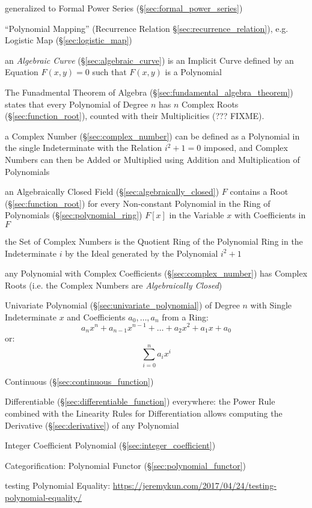 \fist generalized to Formal Power Series (\S\ref{sec:formal_power_series})

\fist ``Polynomial Mapping'' (Recurrence Relation
\S\ref{sec:recurrence_relation}), e.g. Logistic Map (\S\ref{sec:logistic_map})

\fist an \emph{Algebraic Curve} (\S\ref{sec:algebraic_curve}) is an Implicit
Curve defined by an Equation $F(x,y) = 0$ such that $F(x,y)$ is a Polynomial

The Funadmental Theorem of Algebra (\S\ref{sec:fundamental_algebra_theorem})
states that every Polynomial of Degree $n$ has $n$ Complex Roots
(\S\ref{sec:function_root}), counted with their Multiplicities (??? FIXME).

a Complex Number (\S\ref{sec:complex_number}) can be defined as a Polynomial in
the single Indeterminate with the Relation $i^2 + 1 = 0$ imposed, and Complex
Numbers can then be Added or Multiplied using Addition and Multiplication of
Polynomials

an Algebraically Closed Field (\S\ref{sec:algebraically_closed}) $F$ contains a
Root (\S\ref{sec:function_root}) for every Non-constant Polynomial in the Ring
of Polynomials (\S\ref{sec:polynomial_ring}) $F[x]$ in the Variable $x$ with
Coefficients in $F$

the Set of Complex Numbers is the Quotient Ring of the Polynomial Ring in the
Indeterminate $i$ by the Ideal generated by the Polynomial $i^2 + 1$

any Polynomial with Complex Coefficients (\S\ref{sec:complex_number}) has
Complex Roots (i.e. the Complex Numbers are \emph{Algebraically Closed})

Univariate Polynomial (\S\ref{sec:univariate_polynomial}) of Degree
$n$ with Single Indeterminate $x$ and Coefficients $a_0, \ldots, a_n$
from a Ring:
\[
  a_n x^n + a_{n-1} x^{n-1} + \ldots + a_2 x^2 + a_1 x + a_0
\]
or:
\[
  \sum_{i=0}^n a_i x^i
\]

Continuous (\S\ref{sec:continuous_function})

Differentiable (\S\ref{sec:differentiable_function}) everywhere: the Power Rule
combined with the Linearity Rules for Differentiation allows computing the
Derivative (\S\ref{sec:derivative}) of any Polynomial

Integer Coefficient Polynomial (\S\ref{sec:integer_coefficient})

Categorification: Polynomial Functor (\S\ref{sec:polynomial_functor})

testing Polynomial Equality:
\url{https://jeremykun.com/2017/04/24/testing-polynomial-equality/}

